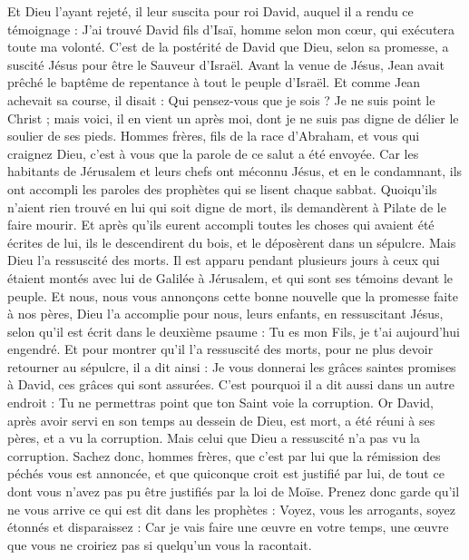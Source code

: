 \begin{multicols}{2}
{Et Dieu l'ayant rejeté, il leur suscita pour roi David, auquel il a rendu ce témoignage : J'ai trouvé David fils d'Isaï, homme selon mon cœur, qui exécutera toute ma volonté.
C'est de la postérité de David que Dieu, selon sa promesse, a suscité Jésus pour être le Sauveur d'Israël.
Avant la venue de Jésus, Jean avait prêché le baptême de repentance à tout le peuple d'Israël.
Et comme Jean achevait sa course, il disait : Qui pensez-vous que je sois ? Je ne suis point le Christ ; mais voici, il en vient un après moi, dont je ne suis pas digne de délier le soulier de ses pieds.
Hommes frères, fils de la race d'Abraham, et vous qui craignez Dieu, c'est à vous que la parole de ce salut a été envoyée.
Car les habitants de Jérusalem et leurs chefs ont méconnu Jésus, et en le condamnant, ils ont accompli les paroles des prophètes qui se lisent chaque sabbat.
Quoiqu'ils n'aient rien trouvé en lui qui soit digne de mort, ils demandèrent à Pilate de le faire mourir.
Et après qu'ils eurent accompli toutes les choses qui avaient été écrites de lui, ils le descendirent du bois, et le déposèrent dans un sépulcre.
Mais Dieu l'a ressuscité des morts.
Il est apparu pendant plusieurs jours à ceux qui étaient montés avec lui de Galilée à Jérusalem, et qui sont ses témoins devant le peuple.
Et nous, nous vous annonçons cette bonne nouvelle que la promesse faite à nos pères,
Dieu l'a accomplie pour nous, leurs enfants, en ressuscitant Jésus, selon qu'il est écrit dans le deuxième psaume : Tu es mon Fils, je t'ai aujourd'hui engendré.
Et pour montrer qu'il l'a ressuscité des morts, pour ne plus devoir retourner au sépulcre, il a dit ainsi : Je vous donnerai les grâces saintes promises à David, ces grâces qui sont assurées.
C'est pourquoi il a dit aussi dans un autre endroit : Tu ne permettras point que ton Saint voie la corruption.
Or David, après avoir servi en son temps au dessein de Dieu, est mort, a été réuni à ses pères, et a vu la corruption.
Mais celui que Dieu a ressuscité n'a pas vu la corruption.
Sachez donc, hommes frères, que c'est par lui que la rémission des péchés vous est annoncée,
et que quiconque croit est justifié par lui, de tout ce dont vous n'avez pas pu être justifiés par la loi de Moïse.
Prenez donc garde qu'il ne vous arrive ce qui est dit dans les prophètes :
Voyez, vous les arrogants, soyez étonnés et disparaissez : Car je vais faire une œuvre en votre temps, une œuvre que vous ne croiriez pas si quelqu'un vous la racontait.
}
\end{multicols}
